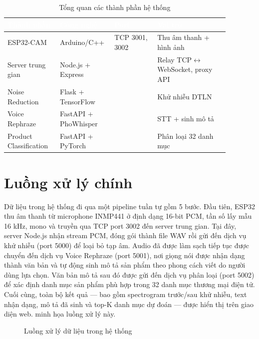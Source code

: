 \begin{table}[htbp]
\centering
\caption{Tổng quan các thành phần hệ thống}
\label{tab:system-overview}
\begin{tabular}{>{\raggedright\arraybackslash}p{0.22\linewidth} >{\centering\arraybackslash}p{0.18\linewidth} >{\centering\arraybackslash}p{0.18\linewidth} >{\raggedright\arraybackslash}p{0.3\linewidth}}
\toprule
\rowcolor{headerblue} \textcolor{white}{\textbf{Thành phần}} & \textcolor{white}{\textbf{Công nghệ}} & \textcolor{white}{\textbf{Port}} & \textcolor{white}{\textbf{Vai trò}} \\
\midrule
\rowcolor{rowgray} ESP32-CAM & Arduino/C++ & TCP 3001, 3002 & Thu âm thanh + hình ảnh \\
Server trung gian & Node.js + Express & 3000 & Relay TCP$\leftrightarrow$WebSocket, proxy API \\
\rowcolor{rowgray} Noise Reduction & Flask + TensorFlow & 5000 & Khử nhiễu DTLN \\
Voice Rephraze & FastAPI + PhoWhisper & 5001 & STT + sinh mô tả \\
\rowcolor{rowgray} Product Classification & FastAPI + PyTorch & 5002 & Phân loại 32 danh mục \\
\bottomrule
\end{tabular}
\end{table}

\section{Luồng xử lý chính}

Dữ liệu trong hệ thống đi qua một pipeline tuần tự gồm 5 bước. Đầu tiên,
ESP32 thu âm thanh từ microphone INMP441 ở định dạng 16-bit PCM, tần số lấy
mẫu 16 kHz, mono và truyền qua TCP port 3002 đến server trung gian. Tại đây,
server Node.js nhận stream PCM, đóng gói thành file WAV rồi gửi đến dịch vụ
khử nhiễu (port 5000) để loại bỏ tạp âm. Audio đã được làm sạch tiếp tục
được chuyển đến dịch vụ Voice Rephraze (port 5001), nơi giọng nói được nhận
dạng thành văn bản và tự động sinh mô tả sản phẩm theo phong cách viết do
người dùng lựa chọn. Văn bản mô tả sau đó được gửi đến dịch vụ phân loại
(port 5002) để xác định danh mục sản phẩm phù hợp trong 32 danh mục thương
mại điện tử. Cuối cùng, toàn bộ kết quả --- bao gồm spectrogram trước/sau
khử nhiễu, text nhận dạng, mô tả đã sinh và top-K danh mục dự đoán ---
được hiển thị trên giao diện web.
 minh họa luồng xử lý này.

\begin{figure}[htbp]
\centering
{}
\caption{Luồng xử lý dữ liệu trong hệ thống}
\label{fig:data-pipeline}
\end{figure}

